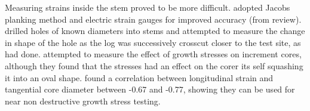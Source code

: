 Measuring strains inside the stem proved to be more difficult. \cite{kikata1972}
adopted Jacobs planking method and electric strain gauges for improved accuracy (from \cite{kubler_1987} review).
\cite{wilhelmy1973probe} drilled holes of known diameters into stems and
attempted to measure the change in shape of the hole as the log was successively
crosscut closer to the test site, as \cite{boyd1950a} had done. \cite{ISI:A1979HU45700004}  attempted to measure the effect of growth stresses on increment cores,
although they found that the stresses had an effect on the corer its self
squashing it into an oval shape. \cite{FERRAND_1982} found a correlation between
longitudinal strain and tangential core diameter between -0.67 and -0.77, showing
they can be used for near non destructive growth stress testing.